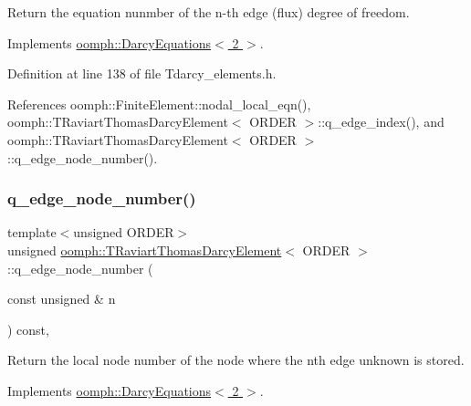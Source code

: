 Return the equation nunmber of the n-\/th edge (flux) degree of freedom. 



Implements \hyperlink{classoomph_1_1DarcyEquations_a559ad66d750c27f54ad342f0c8815e74}{oomph\+::\+Darcy\+Equations$<$ 2 $>$}.



Definition at line 138 of file Tdarcy\+\_\+elements.\+h.



References oomph\+::\+Finite\+Element\+::nodal\+\_\+local\+\_\+eqn(), oomph\+::\+T\+Raviart\+Thomas\+Darcy\+Element$<$ O\+R\+D\+E\+R $>$\+::q\+\_\+edge\+\_\+index(), and oomph\+::\+T\+Raviart\+Thomas\+Darcy\+Element$<$ O\+R\+D\+E\+R $>$\+::q\+\_\+edge\+\_\+node\+\_\+number().

\mbox{\label{classoomph_1_1TRaviartThomasDarcyElement_a81e9386364c70670d6ee4d501cc89da5}} 
\subsubsection{\texorpdfstring{q\+\_\+edge\+\_\+node\+\_\+number()}{q\_edge\_node\_number()}}
{\footnotesize\ttfamily template$<$unsigned O\+R\+D\+ER$>$ \\
unsigned \hyperlink{classoomph_1_1TRaviartThomasDarcyElement}{oomph\+::\+T\+Raviart\+Thomas\+Darcy\+Element}$<$ O\+R\+D\+ER $>$\+::q\+\_\+edge\+\_\+node\+\_\+number (\begin{DoxyParamCaption}\item[{const unsigned \&}]{n }\end{DoxyParamCaption}) const\hspace{0.3cm}{\ttfamily [inline]}, {\ttfamily [virtual]}}



Return the local node number of the node where the nth edge unknown is stored. 



Implements \hyperlink{classoomph_1_1DarcyEquations_a8b16b4fef19d8a785aae3cbf59e3a7cd}{oomph\+::\+Darcy\+Equations$<$ 2 $>$}.



